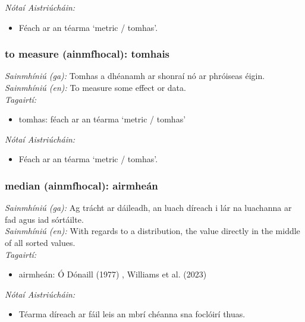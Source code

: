  \noindent \textit{Nótaí Aistriúcháin:}
\begin{itemize}
	\item Féach ar an téarma `metric / tomhas'.
\end{itemize}


\subsubsection*{to measure (ainmfhocal): tomhais}
 \noindent \textit{Sainmhíniú (ga):} Tomhas a dhéanamh ar shonraí nó ar phróiseas éigin.
\\
 \noindent \textit{Sainmhíniú (en):} To measure some effect or data.
\\
 \noindent \textit{Tagairtí:}
\begin{itemize}
	\item tomhas: féach ar an téarma `metric / tomhas'
\end{itemize}

 \noindent \textit{Nótaí Aistriúcháin:}
\begin{itemize}
	\item Féach ar an téarma `metric / tomhas'.
\end{itemize}


\subsubsection*{median (ainmfhocal): airmheán}
 \noindent \textit{Sainmhíniú (ga):} Ag trácht ar dáileadh, an luach díreach i lár na luachanna ar fad agus iad sórtáilte.
\\
 \noindent \textit{Sainmhíniú (en):} With regards to a distribution, the value directly in the middle of all sorted values.
\\
 \noindent \textit{Tagairtí:}
\begin{itemize}
	\item airmheán: Ó Dónaill (1977) \cite{odonaill}, Williams et al. (2023) \cite{storchiste}
\end{itemize}

 \noindent \textit{Nótaí Aistriúcháin:}
\begin{itemize}
	\item Téarma díreach ar fáil leis an mbrí chéanna sna foclóirí thuas.
\end{itemize}


